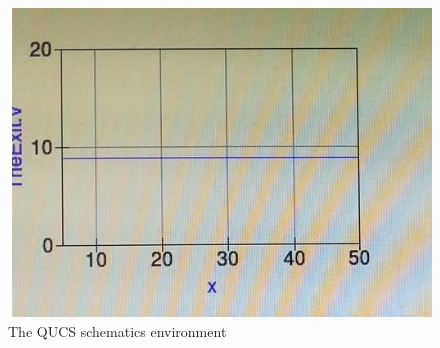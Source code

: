 \documentclass{report}
\begin{document}
\begin{figure}[t]
\includegraphics{Figures/figure_2_.jpg}
\caption{The QUCS schematics environment}
\label{fig:figure2}
\end{figure}
\end{document}
